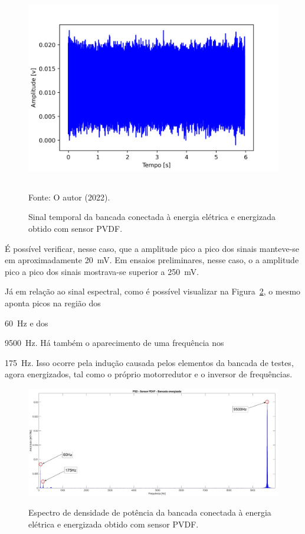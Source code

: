 \documentclass[
	12pt,				
	oneside,			
	a4paper,			
	english,			
	brazil,	
	sumario=abnt-6027-2012		
	]{abntex2ppgsi}
\begin{document}
{{{{\begin{figure}[H]
\centering
\caption {Sinal temporal da bancada conectada à energia elétrica e energizada obtido com sensor PVDF.}
\includegraphics[width=\textwidth,height=90mm,keepaspectratio]{aquisicao_03_maquina_energizada_10_03_2022_08h57min_ajustado_6s} \\
Fonte: O autor (2022).
\label{maquina_ligada_na_tomada_e_energizada}
\end{figure} 

É possível verificar, nesse caso, que a amplitude pico a pico dos sinais manteve-se em aproximadamente {\SI{20}{\milli\volt}}. Em ensaios preliminares, nesse caso, o a amplitude pico a pico dos sinais mostrava-se superior a {\SI{250}{\milli\volt}}. 

Já em relação ao sinal espectral, como é possível visualizar na Figura~\ref{PSD_SENSOR_MAQUINA_LIGADA_E_ENERGIZADA}, o mesmo aponta picos na região dos {\SI{60}{\hertz} e dos {\SI{9500}{\hertz}. Há também o aparecimento de uma frequência nos {\SI{175}{\hertz}. Isso ocorre pela indução causada pelos elementos da bancada de testes, agora energizados, tal como o próprio motorredutor e o inversor de frequências.   

\begin{figure}[H]
\centering
\caption {Espectro de densidade de potência da bancada conectada à energia elétrica e energizada obtido com sensor PVDF.}
\includegraphics[width=170mm,keepaspectratio]{PSD_PVDF_BANCADA_ENERGIZADA}
\label{PSD_SENSOR_MAQUINA_LIGADA_E_ENERGIZADA}
\end{figure} 

}}}}}}}
\end{document}
